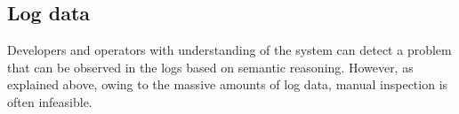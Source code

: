 \begin{table}[htbp]
\centering
\caption{Examples of evolving, noisy, and new log messages.}
\label{tab:evolutionlogs}
\end{table}


\subsection{Log data}\label{ch:concepts:sec:anomalydetectionindistributedsoftwaresystems:subsec:log}
Developers and operators with understanding of the system can detect a problem that can be observed in the logs based on semantic reasoning. However, as explained above, owing to the massive amounts of log data, manual inspection is often infeasible.

